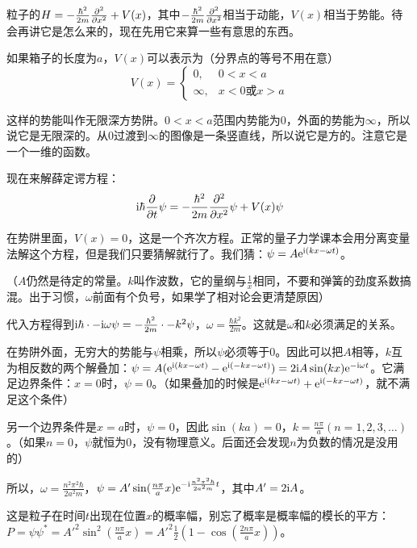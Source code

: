 粒子的$H=-\frac{\hbar^2}{2 m} \frac{\partial^{2}}{\partial x^{2}}+V(x)$，其中$-\frac{\hbar^2}{2 m} \frac{\partial^{2}}{\partial x^{2}}$相当于动能，$V(x)$相当于势能。待会再讲它是怎么来的，现在先用它来算一些有意思的东西。

如果箱子的长度为$a$，$V(x)$可以表示为（分界点的等号不用在意）
\begin{equation*}
V(x)=\begin{cases}
0, &0<x<a \\
\infty, &x<0\text{或}x>a
\end{cases}
\end{equation*}

这样的势能叫作无限深方势阱。$0<x<a$范围内势能为$0$，外面的势能为$\infty$，所以说它是无限深的。从$0$过渡到$\infty$的图像是一条竖直线，所以说它是方的。注意它是一个一维的函数。

现在来解薛定谔方程：
\begin{equation*}
\mathrm{i} \hbar \frac{\partial}{\partial t} \psi=-\frac{\hbar^2}{2 m} \frac{\partial^{2}}{\partial x^{2}} \psi+V(x) \psi
\end{equation*}

在势阱里面，$V(x)=0$，这是一个齐次方程。正常的量子力学课本会用分离变量法解这个方程，但是我们只要猜解就行了。我们猜：$\psi=A \mathrm{e}^{\mathrm{i}(k x-\omega t)}$。

（$A$仍然是待定的常量。$k$叫作波数，它的量纲与$\frac{1}{x}$相同，不要和弹簧的劲度系数搞混。出于习惯，$\omega$前面有个负号，如果学了相对论会更清楚原因）

代入方程得到$\mathrm{i} \hbar \cdot -\mathrm{i} \omega \psi=-\frac{\hbar^2}{2 m} \cdot -k^2 \psi$，$\omega=\frac{\hbar k^2}{2 m}$。这就是$\omega$和$k$必须满足的关系。

在势阱外面，无穷大的势能与$\psi$相乘，所以$\psi$必须等于$0$。因此可以把$A$相等，$k$互为相反数的两个解叠加：$\psi=A (\mathrm{e}^{\mathrm{i}(k x-\omega t)}-\mathrm{e}^{\mathrm{i}(-k x-\omega t)})=2 \mathrm{i} A \sin(k x) \mathrm{e}^{-\mathrm{i} \omega t}$。它满足边界条件：$x=0$时，$\psi=0$。（如果叠加的时候是$\mathrm{e}^{\mathrm{i}(k x-\omega t)}+\mathrm{e}^{\mathrm{i}(-k x-\omega t)}$，就不满足这个条件）

另一个边界条件是$x=a$时，$\psi=0$，因此$\sin(k a)=0$，$k=\frac{n \pi}{a}(n=1,2,3,\dots)$。（如果$n=0$，$\psi$就恒为$0$，没有物理意义。后面还会发现$n$为负数的情况是没用的）

所以，$\omega=\frac{n^2 \pi^2 \hbar}{2 a^2 m}$，$\psi=A' \sin(\frac{n \pi}{a} x) \mathrm{e}^{-\mathrm{i} \frac{n^2 \pi^2 \hbar}{2 a^2 m} t}$，其中$A'=2 \mathrm{i} A$。

这是粒子在时间$t$出现在位置$x$的概率幅，别忘了概率是概率幅的模长的平方：$P=\psi \psi^*=A'^2 \sin^2 (\frac{n \pi}{a} x)=A'^2 \frac{1}{2} (1-\cos(\frac{2 n \pi}{a} x))$。

